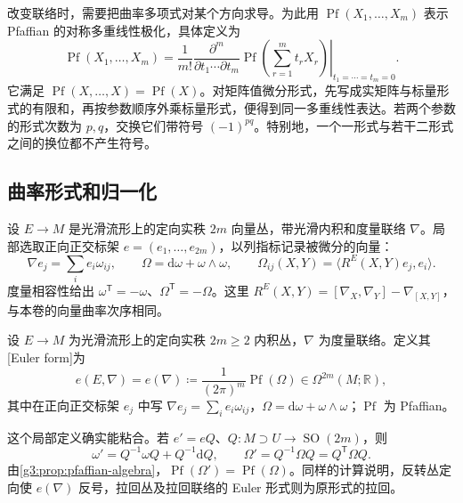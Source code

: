 \ProseParagraphBreak

改变联络时，需要把曲率多项式对某个方向求导。为此用 \(\operatorname{Pf}(X_1,\ldots,X_m)\) 表示 Pfaffian 的对称多重线性极化，具体定义为
\begin{equation}\label{g3:eq:pfaffian-polarization}
	\operatorname{Pf}(X_1,\ldots,X_m)
	=\left.\frac1{m!}\frac{\partial^m}{\partial t_1\cdots\partial t_m}
	\operatorname{Pf}\left(\sum_{r=1}^m t_rX_r\right)\right|_{t_1=\cdots=t_m=0}.
\end{equation}
它满足 \(\operatorname{Pf}(X,\ldots,X)=\operatorname{Pf}(X)\)。对矩阵值微分形式，先写成实矩阵与标量形式的有限和，再按参数顺序外乘标量形式，便得到同一多重线性表达。若两个参数的形式次数为 \(p,q\)，交换它们带符号 \((-1)^{pq}\)。特别地，一个一形式与若干二形式之间的换位都不产生符号。

\subsection{曲率形式和归一化}
\label{g3:subsec:1701:02}
设 \(E\to M\) 是光滑流形上的定向实秩 \(2m\) 向量丛，带光滑内积和度量联络 \(\nabla\)。局部选取正向正交标架 \(e=(e_1,\ldots,e_{2m})\)，以列指标记录被微分的向量：
\begin{equation}\label{g3:eq:euler-connection-curvature}
	\nabla e_j=\sum_i e_i\omega_{ij},\qquad
	\Omega=\mathrm d\omega+\omega\wedge\omega,\qquad
	\Omega_{ij}(X,Y)=\langle R^E(X,Y)e_j,e_i\rangle.
\end{equation}
度量相容性给出 \(\omega^{\mathsf T}=-\omega\)、\(\Omega^{\mathsf T}=-\Omega\)。这里 \(R^E(X,Y)=[\nabla_X,\nabla_Y]-\nabla_{[X,Y]}\)，与本卷的向量曲率次序相同。

\begin{definition}\label{g3:def:euler-form}
	设 \(E\to M\) 为光滑流形上的定向实秩 \(2m\ge2\) 内积丛，\(\nabla\) 为度量联络。定义其[Euler form]为
	\begin{equation}\label{g3:eq:euler-form}
		e(E,\nabla)=e(\nabla)\coloneqq\frac1{(2\pi)^m}\operatorname{Pf}(\Omega)
		\in\Omega^{2m}(M;\mathbb R),
	\end{equation}
	其中在正向正交标架 \(e_j\) 中写 \(\nabla e_j=\sum_i e_i\omega_{ij}\)，\(\Omega=\mathrm d\omega+\omega\wedge\omega\)；\(\operatorname{Pf}\) 为 Pfaffian。
\end{definition}

这个局部定义确实能粘合。若 \(e'=eQ\)、\(Q:M\supset U\to\operatorname{SO}(2m)\)，则
\[
	\omega'=Q^{-1}\omega Q+Q^{-1}\mathrm dQ,\qquad
	\Omega'=Q^{-1}\Omega Q=Q^{\mathsf T}\Omega Q.
\]
由\cref{g3:prop:pfaffian-algebra}，\(\operatorname{Pf}(\Omega')=\operatorname{Pf}(\Omega)\)。同样的计算说明，反转丛定向使 \(e(\nabla)\) 反号，拉回丛及拉回联络的 Euler 形式则为原形式的拉回。

